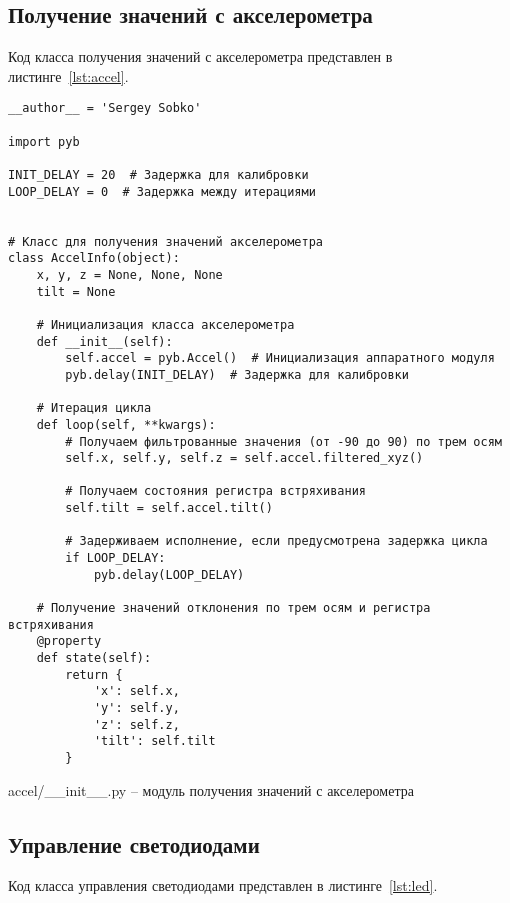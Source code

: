 \documentclass[document.tex]{subfiles}
\begin{document}
\clearpage
\subsection{Получение значений с акселерометра}

Код класса получения значений с акселерометра представлен в листинге~\ref{lst:accel}.

\begin{listing}[ht]
\begin{verbatim}
__author__ = 'Sergey Sobko'

import pyb

INIT_DELAY = 20  # Задержка для калибровки
LOOP_DELAY = 0  # Задержка между итерациями


# Класс для получения значений акселерометра
class AccelInfo(object):
    x, y, z = None, None, None
    tilt = None

    # Инициализация класса акселерометра
    def __init__(self):
        self.accel = pyb.Accel()  # Инициализация аппаратного модуля
        pyb.delay(INIT_DELAY)  # Задержка для калибровки

    # Итерация цикла
    def loop(self, **kwargs):
        # Получаем фильтрованные значения (от -90 до 90) по трем осям
        self.x, self.y, self.z = self.accel.filtered_xyz()
        
        # Получаем состояния регистра встряхивания
        self.tilt = self.accel.tilt()
        
        # Задерживаем исполнение, если предусмотрена задержка цикла
        if LOOP_DELAY:
            pyb.delay(LOOP_DELAY)

    # Получение значений отклонения по трем осям и регистра встряхивания
    @property
    def state(self):
        return {
            'x': self.x,
            'y': self.y,
            'z': self.z,
            'tilt': self.tilt
        }
\end{verbatim}
\caption{accel/\_\_init\_\_.py -- модуль получения значений с акселерометра}
\label{lst:accel}
\end{listing}

\clearpage
\subsection{Управление светодиодами}

Код класса управления светодиодами представлен в листинге~\ref{lst:led}.
\end{document}
